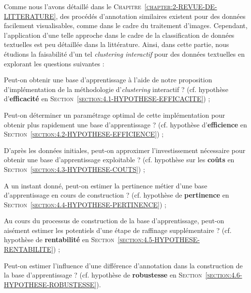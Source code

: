 	Comme nous l'avons détaillé dans le \textsc{Chapitre~\ref{chapter:2-REVUE-DE-LITTERATURE}}, des procédés d'annotation similaires existent pour des données facilement visualisables, comme dans le cadre du traitement d'images.
	Cependant, l'application d'une telle approche dans le cadre de la classification de données textuelles est peu détaillée dans la littérature.
	Ainsi, dans cette partie, nous étudions la faisabilité d'un tel \textit{clustering interactif} pour des données textuelles en explorant les questions suivantes :
	\begin{leftBarImportantRed}
		\begin{todolist}
			\item Peut-on obtenir une base d'apprentissage à l'aide de notre proposition d'implémentation de la méthodologie d'\textit{clustering} interactif ? (cf. hypothèse d'\textbf{efficacité} en \textsc{Section~\ref{section:4.1-HYPOTHESE-EFFICACITE}}) ;
			\item Peut-on déterminer un paramétrage optimal de cette implémentation pour obtenir plus rapidement une base d'apprentissage ? (cf. hypothèse d'\textbf{efficience} en \textsc{Section~\ref{section:4.2-HYPOTHESE-EFFICIENCE}}) ;
			\item D'après les données initiales, peut-on approximer l'investissement nécessaire pour obtenir une base d'apprentissage exploitable ? (cf. hypothèse sur les \textbf{coûts} en \textsc{Section~\ref{section:4.3-HYPOTHESE-COUTS}}) ;
			\item A un instant donné, peut-on estimer la pertinence métier d'une base d'apprentissage en cours de construction ? (cf. hypothèse de \textbf{pertinence} en \textsc{Section~\ref{section:4.4-HYPOTHESE-PERTINENCE}}) ;
			\item Au cours du processus de construction de la base d'apprentissage, peut-on aisément estimer les potentiels d'une étape de raffinage supplémentaire ? (cf. hypothèse de \textbf{rentabilité} en \textsc{Section~\ref{section:4.5-HYPOTHESE-RENTABILITE}}) ;
			\item Peut-on estimer l'influence d'une différence d'annotation dans la construction de la base d'apprentissage ? (cf. hypothèse de \textbf{robustesse} en \textsc{Section~\ref{section:4.6-HYPOTHESE-ROBUSTESSE}}).
		\end{todolist}
	\end{leftBarImportantRed}
	
